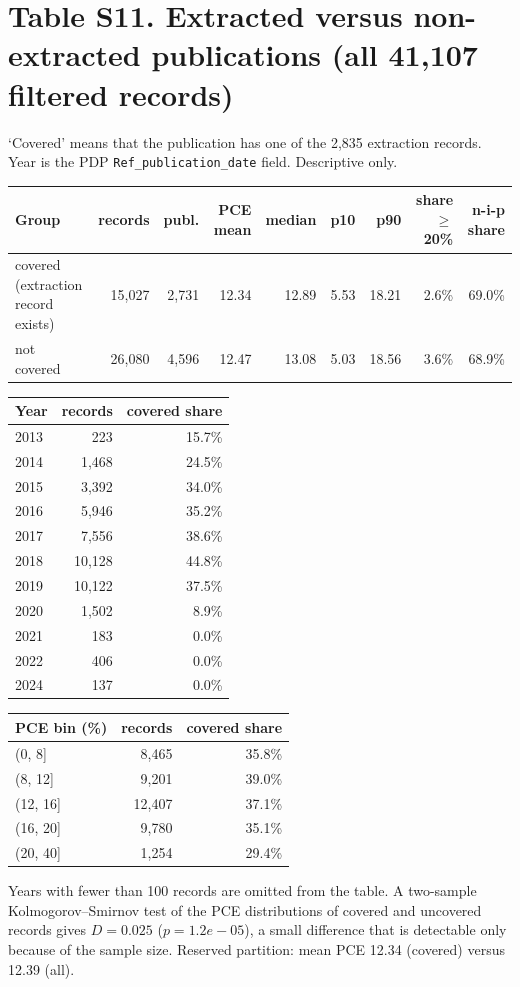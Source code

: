 \documentclass[10pt]{article}
\begin{document}
\section*{Table S11. Extracted versus non-extracted publications (all 41,107 filtered records)}
`Covered' means that the publication has one of the 2,835 extraction records. Year is the PDP \texttt{Ref\_publication\_date} field. Descriptive only.\par\smallskip
\begin{tabular}{lrrrrrrrr}\toprule Group & records & publ. & PCE mean & median & p10 & p90 & share $\geq$20\% & n-i-p share\\\midrule
covered (extraction record exists) & 15,027 & 2,731 & 12.34 & 12.89 & 5.53 & 18.21 & 2.6\% & 69.0\%\\
not covered & 26,080 & 4,596 & 12.47 & 13.08 & 5.03 & 18.56 & 3.6\% & 68.9\%\\
\bottomrule\end{tabular}\par\smallskip
\begin{tabular}{lrr}\toprule Year & records & covered share\\\midrule
2013 & 223 & 15.7\%\\
2014 & 1,468 & 24.5\%\\
2015 & 3,392 & 34.0\%\\
2016 & 5,946 & 35.2\%\\
2017 & 7,556 & 38.6\%\\
2018 & 10,128 & 44.8\%\\
2019 & 10,122 & 37.5\%\\
2020 & 1,502 & 8.9\%\\
2021 & 183 & 0.0\%\\
2022 & 406 & 0.0\%\\
2024 & 137 & 0.0\%\\
\bottomrule\end{tabular}\hspace{1.5cm}\begin{tabular}{lrr}\toprule PCE bin (\%) & records & covered share\\\midrule
(0, 8] & 8,465 & 35.8\%\\
(8, 12] & 9,201 & 39.0\%\\
(12, 16] & 12,407 & 37.1\%\\
(16, 20] & 9,780 & 35.1\%\\
(20, 40] & 1,254 & 29.4\%\\
\bottomrule\end{tabular}\par\smallskip
Years with fewer than 100 records are omitted from the table. A two-sample Kolmogorov--Smirnov test of the PCE distributions of covered and uncovered records gives $D = 0.025$ ($p = 1.2e-05$), a small difference that is detectable only because of the sample size. Reserved partition: mean PCE 12.34 (covered) versus 12.39 (all).\par
\end{document}
